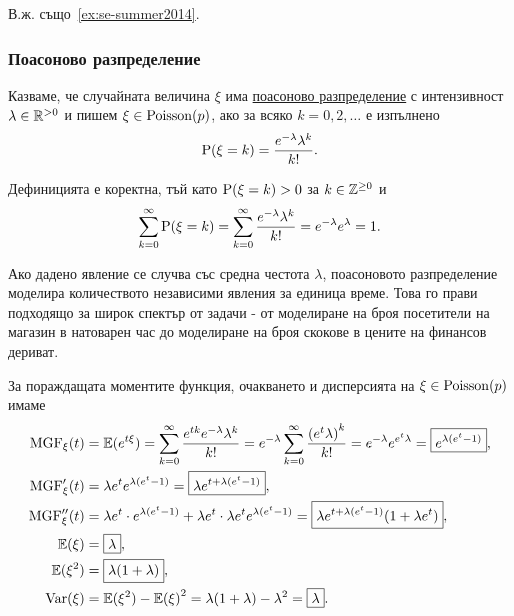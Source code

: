 \documentclass[numbers=endperiod, DIV=15, bibliography=totocnumbered]{scrartcl}
\begin{document}
В.ж. също~\ref{ex:se-summer2014}.

\subsubsection{Поасоново разпределение}\label{dist:poisson}

\begin{definition}
  Казваме, че случайната величина $\xi$ има \uline{поасоново разпределение} с интензивност $\lambda \in \mathbb{R}^{> 0}$ и пишем $\xi \in \operatorname{Poisson}(p)$, ако за всяко $k = 0, 2, \ldots$ е изпълнено
  \begin{displaymath}
    \operatorname{P}(\xi = k) = \frac{e^{-\lambda} \lambda^k} {k!}.
  \end{displaymath}

  Дефиницията е коректна, тъй като $\operatorname{P}(\xi = k) > 0$ за $k \in \mathbb{Z}^{\geq 0}$ и
  \begin{displaymath}
    \sum_{k=0}^\infty \operatorname{P}(\xi = k)
    =
    \sum_{k=0}^\infty \frac{e^{-\lambda} \lambda^k} {k!}
    =
    e^{-\lambda} e^{\lambda}
    =
    1.
  \end{displaymath}
\end{definition}

Ако дадено явление се случва със средна честота $\lambda$, поасоновото разпределение моделира количеството независими явления за единица време. Това го прави подходящо за широк спектър от задачи - от моделиране на броя посетители на магазин в натоварен час до моделиране на броя скокове в цените на финансов дериват.

За пораждащата моментите функция, очакването и дисперсията на $\xi \in \operatorname{Poisson}(p)$ имаме
\begingroup
\allowdisplaybreaks
\begin{align*}
  \operatorname{MGF}_\xi(t)
  &=
  \mathbb{E}(e^{t\xi})
  =
  \sum_{k=0}^\infty \frac{e^{tk} e^{-\lambda} \lambda^k} {k!}
  =
  e^{-\lambda} \sum_{k=0}^\infty \frac{{(e^t \lambda)}^k} {k!}
  =
  e^{-\lambda} e^{e^t \lambda}
  =
  \boxed{e^{\lambda (e^t - 1)}},
  \\
  \operatorname{MGF}'_\xi(t)
  &=
  \lambda e^t e^{\lambda (e^t - 1)}
  =
  \boxed{\lambda e^{t + \lambda (e^t - 1)}},
  \\
  \operatorname{MGF}''_\xi(t)
  &=
  \lambda e^t \cdot e^{\lambda (e^t - 1)} + \lambda e^t \cdot \lambda e^t e^{\lambda (e^t - 1)}
  =
  \boxed{\lambda e^{t + \lambda (e^t - 1)} (1 + \lambda e^t)},
  \\
  \mathbb{E}(\xi)
  &=
  \boxed{\lambda},
  \\
  \mathbb{E}(\xi^2)
  &=
  \boxed{\lambda(1 + \lambda)},
  \\
  \operatorname{Var}(\xi)
  &=
  \mathbb{E}(\xi^2) - {\mathbb{E}(\xi)}^2
  =
  \lambda(1 + \lambda) - \lambda^2
  =
  \boxed{\lambda}.
\end{align*}
\endgroup
\end{document}
